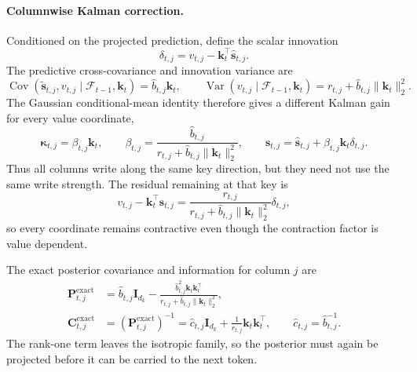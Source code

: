 \documentclass[11pt]{article}
\newcommand{\vct}[1]{\boldsymbol{#1}}
\begin{document}
\paragraph{Columnwise Kalman correction.}
Conditioned on the projected prediction, define the scalar innovation
\begin{equation}
  \delta_{t,j}
  =v_{t,j}-\vct{k}_t^\top\widehat{\vct{s}}_{t,j}.
  \label{eq:discussion-value-iso-innovation}
\end{equation}
The predictive cross-covariance and innovation variance are
\begin{equation}
  \operatorname{Cov}\!\left(
    \widetilde{\vct{s}}_{t,j},v_{t,j}\mid\mathcal{F}_{t-1},\vct{k}_t
  \right)
  =\widehat b_{t,j}\vct{k}_t,
  \qquad
  \operatorname{Var}\!\left(
    v_{t,j}\mid\mathcal{F}_{t-1},\vct{k}_t
  \right)
  =r_{t,j}+\widehat b_{t,j}\|\vct{k}_t\|_2^2.
  \label{eq:discussion-value-iso-joint-moments}
\end{equation}
The Gaussian conditional-mean identity therefore gives a different Kalman gain for every value
coordinate,
\begin{equation}
  \vct{\kappa}_{t,j}
  =\beta_{t,j}\vct{k}_t,
  \qquad
  \beta_{t,j}
  =\frac{\widehat b_{t,j}}
    {r_{t,j}+\widehat b_{t,j}\|\vct{k}_t\|_2^2},
  \qquad
  \vct{s}_{t,j}
  =\widehat{\vct{s}}_{t,j}
   +\beta_{t,j}\vct{k}_t\delta_{t,j}.
  \label{eq:discussion-value-iso-gain}
\end{equation}
Thus all columns write along the same key direction, but they need not use the same write strength.
The residual remaining at that key is
\begin{equation}
  v_{t,j}-\vct{k}_t^\top\vct{s}_{t,j}
  =\frac{r_{t,j}}
    {r_{t,j}+\widehat b_{t,j}\|\vct{k}_t\|_2^2}
    \delta_{t,j},
  \label{eq:discussion-value-iso-residual-contraction}
\end{equation}
so every coordinate remains contractive even though the contraction factor is value dependent.

The exact posterior covariance and information for column $j$ are
\begin{equation}
\begin{aligned}
  \vct{P}_{t,j}^{\mathrm{exact}}
  &=\widehat b_{t,j}\vct{I}_{d_k}
    -\frac{\widehat b_{t,j}^2\vct{k}_t\vct{k}_t^\top}
      {r_{t,j}+\widehat b_{t,j}\|\vct{k}_t\|_2^2},
  \\
  \vct{C}_{t,j}^{\mathrm{exact}}
  &=\left(\vct{P}_{t,j}^{\mathrm{exact}}\right)^{-1}
   =\widehat c_{t,j}\vct{I}_{d_k}
    +\frac{1}{r_{t,j}}\vct{k}_t\vct{k}_t^\top,
  \qquad
  \widehat c_{t,j}=\widehat b_{t,j}^{-1}.
\end{aligned}
  \label{eq:discussion-value-iso-exact-posterior}
\end{equation}
The rank-one term leaves the isotropic family, so the posterior must again be projected before it
can be carried to the next token.
\end{document}
